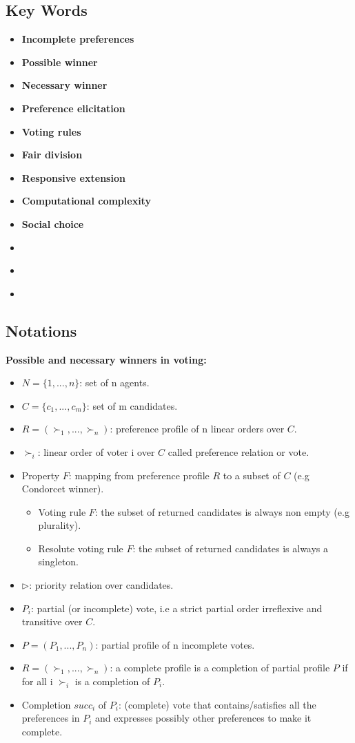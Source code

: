 \documentclass[12pt,a4paper]{article}
\begin{document}
\subsection*{Key Words}
\begin{itemize}
    \item \textbf{Incomplete preferences}
    \item \textbf{Possible winner}
    \item \textbf{Necessary winner}
    \item \textbf{Preference elicitation}
    \item \textbf{Voting rules}
    \item \textbf{Fair division}
    \item \textbf{Responsive extension}
    \item \textbf{Computational complexity}
    \item \textbf{Social choice}
    \item \textbf{ }
    \item \textbf{}
    \item \textbf{}
\end{itemize}

\subsection*{Notations}
\textbf{Possible and necessary winners in voting:}
\begin{itemize}
    \item $N = \{1, ..., n\}$: set of n agents.
    \item $C = \{c_1, ..., c_m\}$: set of m candidates.
    \item $R = (\succ_1, ..., \succ_n)$: preference profile of n linear orders over $C$.
    \item $\succ_i$: linear order of voter i over $C$ called preference relation or vote.
    \item Property $F$: mapping from preference profile $R$ to a subset of $C$ (e.g Condorcet winner).
    \begin{itemize}
        \item Voting rule $F$: the subset of returned candidates is always non empty (e.g plurality).
        \item Resolute voting rule $F$: the subset of returned candidates is always a singleton.
    \end{itemize}
    \item $\triangleright$: priority relation over candidates.
    \item $P_i$: partial (or incomplete) vote, i.e a strict partial order irreflexive and transitive over $C$.
    \item $P = (P_1, ..., P_n)$: partial profile of n incomplete votes.
    \item $R = (\succ_1, ..., \succ_n)$: a complete profile is a completion of partial profile $P$ if for all i $\succ_i$ is a completion of $P_i$.
    \item Completion $succ_i$ of $P_i$: (complete) vote that contains/satisfies all the preferences in $P_i$ and expresses possibly other preferences to make it complete.
\end{itemize}
\end{document}
